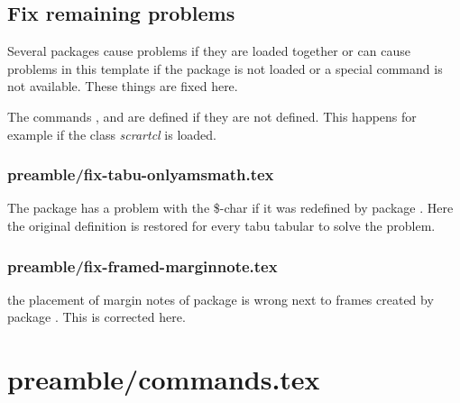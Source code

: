 \subsection{Fix remaining problems}

Several packages cause problems if they are loaded together or can cause problems in this template if the package is not loaded or a special command is not available. These things are fixed here.

The commands ,  and  are defined if they are not defined. This happens for example if the class \emph{scrartcl} is loaded.


\subsubsection{preamble/fix-tabu-onlyamsmath.tex}

The package  has a problem with the \$-char if it was redefined by package . Here the original definition is restored for every tabu tabular to solve the problem.


\subsubsection{preamble/fix-framed-marginnote.tex}

the placement of margin notes of package  is wrong next to frames created by package . This is corrected here.



\section{preamble/commands.tex}

